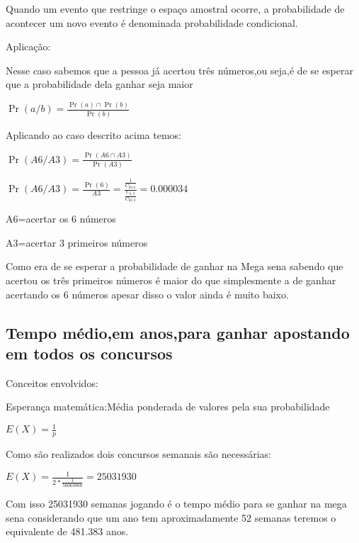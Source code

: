 \documentclass{article}
\begin{document}
Quando um evento que restringe o espaço amostral ocorre, a probabilidade de acontecer um novo evento é denominada probabilidade condicional.

\hfill

Aplicação:
\hfill

Nesse caso sabemos que a pessoa já acertou três números,ou seja,é de se esperar que a probabilidade dela ganhar seja maior 


\begin{center}
    $\Pr(a/b)=\frac{\Pr(a)\cap \Pr(b)}{\Pr(b)}$
\end{center}

\hfill

Aplicando ao caso descrito acima temos:
\begin{center}
    $\Pr(A6/A3)=\frac{\Pr(A6 \cap A3)}{\Pr( A3)}$
    
    
    $\Pr(A6/A3)=\frac{\Pr(6)}{A3}=\frac{\frac{1}{C_{60,6}}}{\frac{C_{6,3}}{C_{60,3}}}=0.000034$
    
    A6=acertar os 6 números
    
    A3=acertar 3 primeiros números
\end{center}

\hfill

Como era de se esperar a probabilidade de ganhar na Mega sena sabendo que acertou os três primeiros números é maior do que simplesmente a de ganhar acertando os 6 números apesar disso o valor ainda é muito baixo.

\subsection{Tempo médio,em anos,para ganhar apostando em 
todos os concursos}
\hfill

Conceitos envolvidos:

\hfill

Esperança matemática:Média ponderada de valores pela sua probabilidade 

\begin{center}
    $E(X)=\frac{1}{p}$
\end{center}

Como são realizados dois concursos semanais são necessárias:

\begin{center}
    $E(X)=\frac{1}{2*\frac{1}{50063860}}=25031930$
\end{center}

Com isso 25031930 semanas jogando é o tempo médio para se  ganhar na mega sena considerando que um ano tem aproximadamente 52 semanas teremos o equivalente de 481.383 anos.
\end{document}
